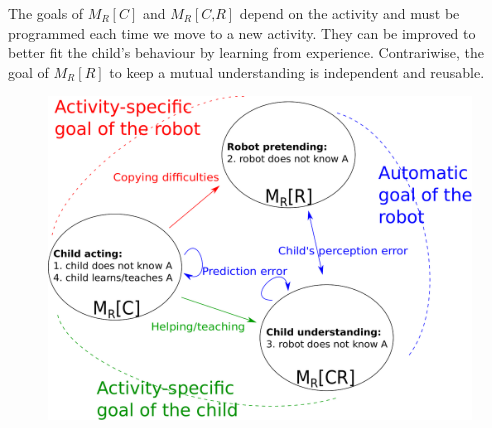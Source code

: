 \documentclass[conference]{IEEEtran}
\begin{document}
The goals of $ M_R\left[\textit{C}\right]$ and $ M_R\left[\textit{C,R}\right]$ depend on the activity and must be programmed each time we move to a new activity. They can be improved to better fit the child's behaviour by learning from experience. Contrariwise, the goal of $ M_R\left[\textit{R}\right]$ to keep a mutual understanding is independent and reusable. 

\begin{figure}[!]
\centering
\includegraphics[width=1\columnwidth]{mutual_behaviour}
\caption{\small\textbf{}  }
\label{mm}
\end{figure} 






\end{document}
